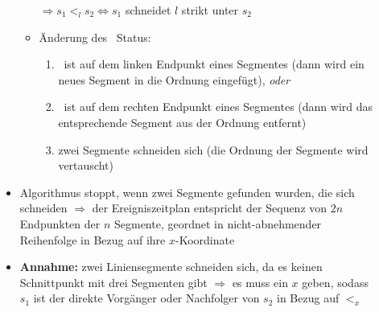 \begin{description}
\begin{itemize}
\begin{itemize}
					$\Rightarrow s_1 <_l s_2 \Longleftrightarrow s_1$ schneidet $l$ strikt unter $s_2$
					\item Änderung des \sweep~Status:
						\begin{enumerate}
							\item \sweep~ist auf dem linken Endpunkt eines Segmentes  (dann wird ein neues Segment in die Ordnung eingefügt), \textit{oder}
							\item \sweep~ist auf dem rechten Endpunkt eines Segmentes  (dann wird das entsprechende Segment aus der Ordnung entfernt)
							\item zwei Segmente schneiden sich (die Ordnung der Segmente wird vertauscht)
						\end{enumerate}
				\end{itemize}
			\item Algorithmus stoppt, wenn zwei Segmente gefunden wurden, die sich schneiden $\Rightarrow$ der Ereigniszeitplan entspricht der Sequenz von $2n$ Endpunkten der $n$ Segmente, geordnet in nicht-abnehmender Reihenfolge in Bezug auf ihre $x$-Koordinate
			\item \textbf{Annahme:} zwei Liniensegmente schneiden sich, da es keinen Schnittpunkt mit drei Segmenten gibt $\Rightarrow$ es muss ein $x$ geben, sodass $s_1$ ist der direkte Vorgänger oder Nachfolger von $s_2$ in Bezug auf $<_x$
		\end{itemize}
\end{description}
\topbreak
\up\up
